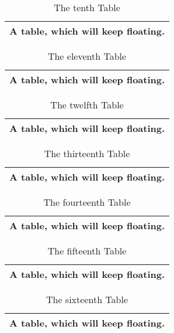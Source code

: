 \documentclass[british]{article}[2007/10/19]%
\begin{document}
\begin{table}[t] \centering%
\begin{tabular}{|l|}
\hline
A table, which will keep floating.\\ \hline
\end{tabular}%
\caption{The tenth Table}%
\end{table}%

\begin{table}[t] \centering%
\begin{tabular}{|l|}
\hline
A table, which will keep floating.\\ \hline
\end{tabular}%
\caption{The eleventh Table}%
\end{table}%

\begin{table}[t] \centering%
\begin{tabular}{|l|}
\hline
A table, which will keep floating.\\ \hline
\end{tabular}%
\caption{The twelfth Table}%
\end{table}%

\begin{table}[t] \centering%
\begin{tabular}{|l|}
\hline
A table, which will keep floating.\\ \hline
\end{tabular}%
\caption{The thirteenth Table}%
\end{table}%

\begin{table}[t] \centering%
\begin{tabular}{|l|}
\hline
A table, which will keep floating.\\ \hline
\end{tabular}%
\caption{The fourteenth Table}%
\end{table}%

\begin{table}[t] \centering%
\begin{tabular}{|l|}
\hline
A table, which will keep floating.\\ \hline
\end{tabular}%
\caption{The fifteenth Table}%
\end{table}%

\begin{table}[t] \centering%
\begin{tabular}{|l|}
\hline
A table, which will keep floating.\\ \hline
\end{tabular}%
\caption{The sixteenth Table}%
\end{table}%
\end{document}
